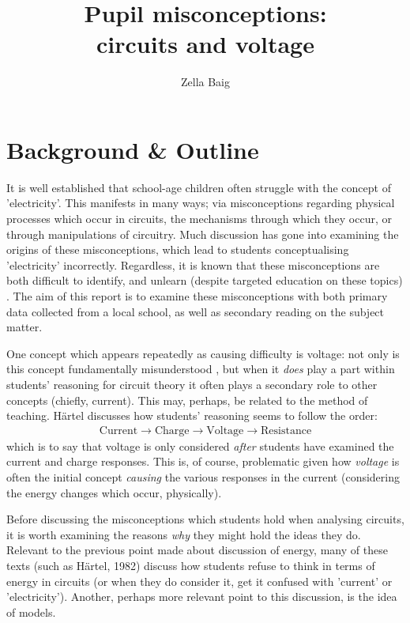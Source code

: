 \documentclass[a4paper,openany,nobib]{tufte-book}
\title{Pupil misconceptions:\\ \noindent circuits and voltage}
\author{Zella Baig}
\begin{document}
\frontmatter
{\maketitle}
\tableofcontents
\thispagestyle{empty}
\mainmatter
\chapter{Background \& Outline}
\setcounter{page}{1}
It is well established that school-age children often struggle with the concept of {'electricity'\autocite{psillos}}.
This manifests in many ways;
via misconceptions regarding physical processes which occur in circuits, the mechanisms through which they occur, or through manipulations of circuitry. Much discussion has gone into examining the origins of these misconceptions,
which lead to students conceptualising 'electricity' incorrectly.
Regardless, it is known that these misconceptions are both difficult to identify, and unlearn (despite targeted education on these {topics)
\autocite{lee2001}}.
The aim of this report is to examine these misconceptions with both primary data collected from a local school, as well as secondary reading on the subject matter.

One concept which appears repeatedly as causing difficulty is voltage: not only is this concept fundamentally {misunderstood \autocite{shipstone_children}}, but when it \emph{does} play a part within students' reasoning for circuit theory it often plays a secondary role to other concepts (chiefly, current).
This may, perhaps, be related to the method of teaching. 
Härtel discusses how students' reasoning seems to follow the {order\autocite{hartel82}}:
\begin{align*}
	\text{Current}\rightarrow \text{Charge} \rightarrow \text{Voltage} \rightarrow \text{Resistance}
\end{align*}
which is to say that voltage is only considered \emph{after} students have examined the current and charge responses. This is, of course, problematic given how \emph{voltage} is often the initial concept \emph{causing} the various responses in the current (considering the energy changes which occur, physically).

Before discussing the misconceptions which students hold when analysing circuits, it is worth examining the reasons \emph{why} they might hold the ideas they do.
Relevant to the previous point made about discussion of energy, many of these texts (such as Härtel, 1982) discuss how students refuse to think in terms of energy in circuits (or when they do consider it, get it confused with 'current' or 'electricity').
Another, perhaps more relevant point to this discussion, is the idea of models.
\end{document}

